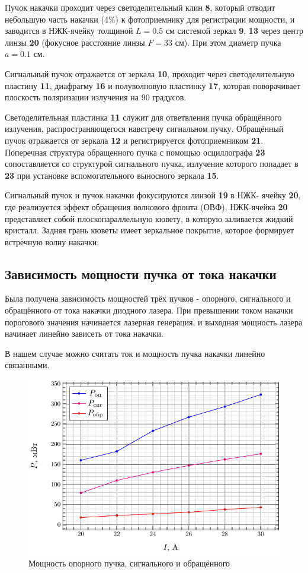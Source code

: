 \documentclass[a4paper,14pt]{extarticle}
\begin{document}
Пучок накачки проходит через светоделительный клин \textbf{8}, который отводит небольшую часть накачки (4\%) к фотоприемнику для регистрации мощности, и заводится в НЖК-ячейку толщиной $L=0.5$ см системой зеркал \textbf{9}, \textbf{13} через центр линзы \textbf{20} (фокусное расстояние линзы $F=33$ см). При этом диаметр пучка $a = 0.1$ см.

Сигнальный пучок отражается от зеркала \textbf{10}, проходит через светоделительную пластину \textbf{11}, диафрагму \textbf{16} и полуволновую пластинку \textbf{17}, которая поворачивает плоскость поляризации излучения на 90 градусов.

Светоделительная пластинка \textbf{11} служит для ответвления пучка обращённого излучения, распространяющегося навстречу сигнальном пучку. Обращённый пучок отражается от зеркала \textbf{12} и регистрируется фотоприемником \textbf{21}. Поперечная структура обращенного пучка с помощью осциллографа \textbf{23} сопоставляется со структурой сигнального пучка, излучение которого попадает в \textbf{23} при установке вспомогательного выносного зеркала \textbf{15}.

Сигнальный пучок и пучок накачки фокусируются линзой \textbf{19} в НЖК- ячейку \textbf{20}, где реализуется эффект обращения волнового фронта (ОВФ). НЖК-ячейка \textbf{20} представляет собой плоскопараллельную кювету, в которую заливается жидкий кристалл. Задняя грань кюветы имеет зеркальное покрытие, которое формирует встречную волну накачки.


\newpage
\subsection{Зависимость мощности пучка от тока накачки}
Была получена зависимость мощностей трёх пучков - опорного, сигнального и обращённого от тока накачки диодного лазера. При превышении током накачки порогового значения начинается лазерная генерация, и выходная мощность лазера начинает линейно зависеть от тока накачки. 

В нашем случае можно считать ток и мощность пучка накачки линейно связанными.
\begin{figure}[H]
	\centering
	\includegraphics[scale=1.33]{fig/p}
	\caption{Мощность опорного пучка, сигнального и обращённого}
	\label{fig:1}
\end{figure}
\end{document}
